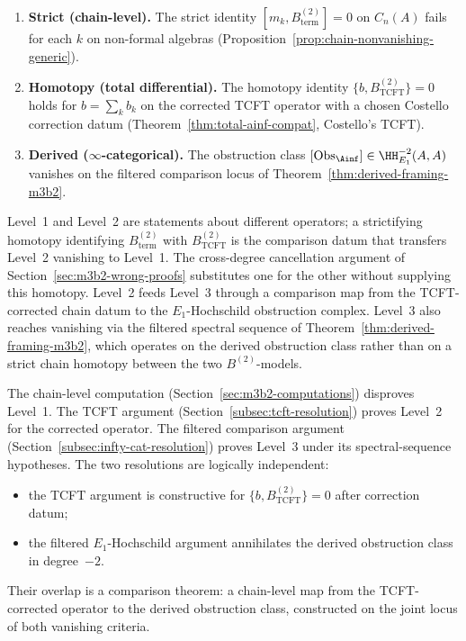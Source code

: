 \begin{definition}
\label{def:three-levels}
\mbox{}
\begin{enumerate}[label=\textup{Level \arabic*.}]
 \item \textbf{Strict (chain-level).}
 The strict identity $[m_k, B^{(2)}_{\mathrm{term}}] = 0$ on $C_n(A)$
 fails for each $k$ on non-formal algebras
 (Proposition~\ref{prop:chain-nonvanishing-generic}).

 \item \textbf{Homotopy (total differential).}
 The homotopy identity $\{b, B^{(2)}_{\mathrm{TCFT}}\} = 0$ holds for
 $b = \sum_k b_k$ on the corrected TCFT operator with a chosen
 Costello correction datum
 (Theorem~\ref{thm:total-ainf-compat}, Costello's TCFT).

 \item \textbf{Derived ($\infty$-categorical).}
 The obstruction class
 $[\mathrm{Obs}_{\Ainf}] \in \HH^{-2}_{E_1}(A, A)$ vanishes on the
 filtered comparison locus of
 Theorem~\ref{thm:derived-framing-m3b2}.
\end{enumerate}
\end{definition}

\begin{remark}
\label{rem:three-level-relationship}
Level~1 and Level~2 are statements about different operators; a
strictifying homotopy identifying $B^{(2)}_{\mathrm{term}}$ with
$B^{(2)}_{\mathrm{TCFT}}$ is the comparison datum that transfers
Level~2 vanishing to Level~1. The cross-degree cancellation argument
of Section~\ref{sec:m3b2-wrong-proofs} substitutes one for the other
without supplying this homotopy. Level~2 feeds Level~3 through a
comparison map from the TCFT-corrected chain datum to the
$E_1$-Hochschild obstruction complex. Level~3 also reaches
vanishing via the filtered spectral sequence of
Theorem~\ref{thm:derived-framing-m3b2}, which operates on the
derived obstruction class rather than on a strict chain homotopy
between the two $B^{(2)}$-models.

The chain-level computation (Section~\ref{sec:m3b2-computations})
disproves Level~1.  The TCFT argument
(Section~\ref{subsec:tcft-resolution}) proves Level~2 for the
corrected operator.  The filtered comparison argument
(Section~\ref{subsec:infty-cat-resolution}) proves Level~3 under
its spectral-sequence hypotheses.  The two resolutions are
logically independent:
\begin{itemize}
 \item the TCFT argument is constructive for
 $\{b,B^{(2)}_{\mathrm{TCFT}}\}=0$ after correction datum;
 \item the filtered $E_1$-Hochschild argument annihilates the
 derived obstruction class in degree~$-2$.
\end{itemize}
Their overlap is a comparison theorem: a chain-level map from the
TCFT-corrected operator to the derived obstruction class, constructed
on the joint locus of both vanishing criteria.
\end{remark}

